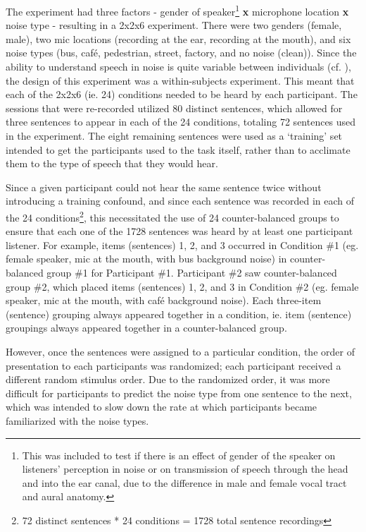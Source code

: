 The experiment had three factors - gender of speaker\footnote{This was included to test if there is an effect of gender of the speaker on listeners' perception in noise or on transmission of speech through the head and into the ear canal, due to the difference in male and female vocal tract and aural anatomy.} \textbf{x} microphone location \textbf{x} noise type - resulting in a 2x2x6 experiment.  There were two genders (female, male), two mic locations (recording at the ear, recording at the mouth), and six noise types (bus, caf\'{e}, pedestrian, street, factory, and no noise (clean)).  Since the ability to understand speech in noise is quite variable between individuals (cf. \cite{ding:13,gilbert:13}), the design of this experiment was a within-subjects experiment.  This meant that each of the 2x2x6 (ie. 24) conditions needed to be heard by each participant.  The sessions that were re-recorded utilized 80 distinct sentences, which allowed for three sentences to appear in each of the 24 conditions, totaling 72 sentences used in the experiment.  The eight remaining sentences were used as a `training' set intended to get the participants used to the task itself, rather than to acclimate them to the type of speech that they would hear.

Since a given participant could not hear the same sentence twice without introducing a training confound, and since each sentence was recorded in each of the 24 conditions\footnote{72 distinct sentences * 24 conditions = 1728 total sentence recordings}, this necessitated the use of 24 counter-balanced groups to ensure that each one of the 1728 sentences was heard by at least one participant listener.  For example, items (sentences) 1, 2, and 3 occurred in Condition \#1 (eg. female speaker, mic at the mouth, with bus background noise) in counter-balanced group \#1 for Participant \#1. Participant \#2 saw counter-balanced group \#2, which placed items (sentences) 1, 2, and 3 in Condition \#2 (eg. female speaker, mic at the mouth, with caf\'{e} background noise).  Each three-item (sentence) grouping always appeared together in a condition, ie. item (sentence) groupings always appeared together in a counter-balanced group.  

However, once the sentences were assigned to a particular condition, the order of presentation to each participants was randomized; each participant received a different random stimulus order.  Due to the randomized order, it was more difficult for participants to predict the noise type from one sentence to the next, which was intended to slow down the rate at which participants became familiarized with the noise types.

